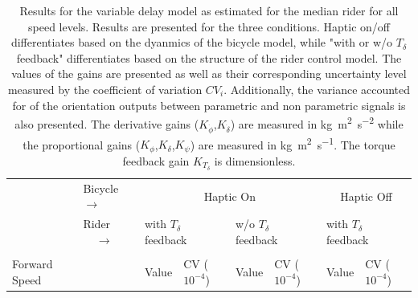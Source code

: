 \begin{table}[]
    \caption{ Results for the variable delay model as estimated for the median rider for all speed levels. Results are presented for the three conditions. Haptic on/off differentiates based on the dyanmics of the bicycle model, while "with or w/o \ensuremath{T_\delta} feedback" differentiates based on the structure of the rider control model. The values of the gains are presented as well as their corresponding uncertainty level measured by the coefficient of variation \ensuremath{CV_i}. Additionally, the variance accounted for of the orientation outputs between parametric and non parametric signals is also presented. The derivative gains (\ensuremath{K_{\dot{\phi}}},\ensuremath{K_{\dot{\delta}}}) are measured in \si{\kilogram\square\meter\per\square\second} while the proportional gains (\ensuremath{K_{\phi}},\ensuremath{K_{\delta}},\ensuremath{K_{\psi}}) are measured in \si{\kilogram\square\meter\per\second}. The torque feedback gain \ensuremath{K_{T_\delta}} is dimensionless.}
    \label{tb:variable}
    \begin{tabular}{llcccccc}
    \hline
                                                   & Bicycle $\rightarrow$                                  & \multicolumn{4}{c}{Haptic On}                                                                                                                                                                           & \multicolumn{2}{c}{Haptic Off}                                                                     \\ \cline{2-8} 
                                                   & {\color[HTML]{333333} Rider $\;\;\;\;\rightarrow$} & \multicolumn{2}{l}{with $T_\delta$ feedback}                                                       & \multicolumn{2}{l}{w/o  $T_\delta$ feedback}                                                       & \multicolumn{2}{l}{with $T_\delta$ feedback}                                                       \\ \cline{2-8} 
                                                   &                                                        & \multicolumn{1}{l}{}                        & \multicolumn{1}{l}{}                                 & \multicolumn{1}{l}{}                        & \multicolumn{1}{l}{}                                 & \multicolumn{1}{l}{}                        & \multicolumn{1}{l}{}                                 \\
    \multirow{-2}{*}{Forward Speed}                &                                                        & \multicolumn{1}{l}{\multirow{-2}{*}{Value}} & \multicolumn{1}{l}{\multirow{-2}{*}{CV ($10^{-4}$)}} & \multicolumn{1}{l}{\multirow{-2}{*}{Value}} & \multicolumn{1}{l}{\multirow{-2}{*}{CV ($10^{-4}$)}} & \multicolumn{1}{l}{\multirow{-2}{*}{Value}} & \multicolumn{1}{l}{\multirow{-2}{*}{CV ($10^{-4}$)}} \\ \hline

\end{tabular}
\end{table}
